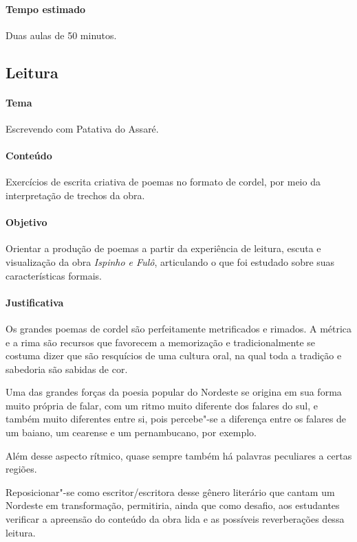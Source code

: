 \documentclass[12pt]{extarticle}
\begin{document}
\paragraph{Tempo estimado} Duas aulas de 50 minutos. 

\subsection{Leitura}

\paragraph{Tema} Escrevendo com Patativa do Assaré.

\paragraph{Conteúdo} Exercícios de escrita criativa de poemas no formato 
de cordel, por meio da interpretação de trechos da obra.

\paragraph{Objetivo} Orientar a produção de poemas a partir da experiência
de leitura, escuta e visualização da obra \emph{Ispinho e Fulô}, 
articulando o que foi estudado sobre suas características formais.

\paragraph{Justificativa} Os grandes poemas de cordel são perfeitamente 
metrificados e rimados. A métrica e a rima são recursos que
favorecem a memorização e tradicionalmente se costuma
dizer que são resquícios de uma cultura oral, na qual toda a
tradição e sabedoria são sabidas de cor.

Uma das grandes forças da poesia popular do Nordeste
se origina em sua forma muito própria de falar, com um
ritmo muito diferente dos falares do sul, e também muito
diferentes entre si, pois percebe"-se a diferença entre os
falares de um baiano, um cearense e um pernambucano,
por exemplo.

Além desse aspecto rítmico, quase sempre também há
palavras peculiares a certas regiões.

Reposicionar"-se como escritor/escritora desse gênero literário que 
cantam um Nordeste em transformação, permitiria, ainda que como desafio, 
aos estudantes verificar a apreensão do conteúdo da obra lida e as 
possíveis reverberações dessa leitura.
\end{document}
